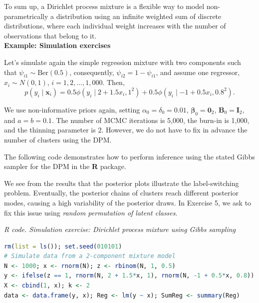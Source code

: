 To sum up, a Dirichlet process mixture is a flexible way to model non-parametrically a distribution using an infinite weighted sum of discrete distributions, where each individual weight increases with the number of observations that belong to it.\\

\textbf{Example: Simulation exercises}

Let's simulate again the simple regression mixture with two components such that $\psi_{i1}\sim \text{Ber}(0.5)$, consequently, $\psi_{i2}=1-\psi_{i1}$, and assume one regressor, $x_i\sim N(0,1)$, $i=1,2,\dots,1,000$. Then, 
$$p(y_i \mid \boldsymbol{x}_i) = 
0.5 \phi(y_i \mid 2+1.5x_i,1^2)+0.5 \phi(y_i \mid -1+0.5x_i,0.8^2).$$

We use non-informative priors again, setting $\alpha_{0}=\delta_{0}=0.01$, $\boldsymbol{\beta}_{0}=\boldsymbol{0}_2$, $\boldsymbol{B}_{0}=\boldsymbol{I}_2$, and $a=b=0.1$. The number of MCMC iterations is 5,000, the burn-in is 1,000, and the thinning parameter is 2. However, we do not have to fix in advance the number of clusters using the DPM.

The following code demonstrates how to perform inference using the stated Gibbs sampler for the DPM in the \textbf{R} package.

We see from the results that the posterior plots illustrate the label-switching problem. Eventually, the posterior chains of clusters reach different posterior modes, causing a high variability of the posterior draws. In Exercise 5, we ask to fix this issue using \textit{random permutation of latent classes}.

\begin{tcolorbox}[enhanced,width=4.67in,center upper,
	fontupper=\large\bfseries,drop shadow southwest,sharp corners]
	\textit{R code. Simulation exercise: Dirichlet process mixture using Gibbs sampling}
	\begin{VF}
		\begin{lstlisting}[language=R]
rm(list = ls()); set.seed(010101)
# Simulate data from a 2-component mixture model
N <- 1000; x <- rnorm(N); z <- rbinom(N, 1, 0.5)
y <- ifelse(z == 1, rnorm(N, 2 + 1.5*x, 1), rnorm(N, -1 + 0.5*x, 0.8))
X <- cbind(1, x); k <- 2
data <- data.frame(y, x); Reg <- lm(y ~ x); SumReg <- summary(Reg)
\end{lstlisting}
	\end{VF}
\end{tcolorbox}

